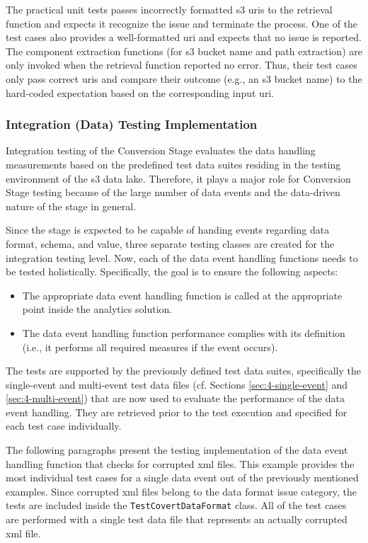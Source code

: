 The practical unit tests passes incorrectly formatted \ac{s3} \acp{uri} to the retrieval function and expects it recognize the issue and terminate the process. One of the test cases also provides a well-formatted \ac{uri} and expects that no issue is reported. The component extraction functions (for \ac{s3} bucket name and path extraction) are only invoked when the retrieval function reported no error. Thus, their test cases only pass correct \acp{uri} and compare their outcome (e.g., an \ac{s3} bucket name) to the hard-coded expectation based on the corresponding input \ac{uri}.

\subsubsection{Integration (Data) Testing Implementation}
Integration testing of the Conversion Stage evaluates the data handling measurements based on the predefined test data suites residing in the testing environment of the \ac{s3} data lake. Therefore, it plays a major role for Conversion Stage testing because of the large number of data events and the data-driven nature of the stage in general.

Since the stage is expected to be capable of handing events regarding data format, schema, and value, three separate testing classes are created for the integration testing level. Now, each of the data event handling functions needs to be tested holistically. Specifically, the goal is to ensure the following aspects:

\begin{itemize}
	\item The appropriate data event handling function is called at the appropriate point inside the analytics solution.
	\item The data event handling function performance complies with its definition (i.e., it performs all required measures if the event occurs).
\end{itemize}

The tests are supported by the previously defined test data suites, specifically the single-event and multi-event test data files (cf. Sections \ref{sec:4-single-event} and \ref{sec:4-multi-event}) that are now used to evaluate the performance of the data event handling. They are retrieved prior to the test execution and specified for each test case individually.

The following paragraphs present the testing implementation of the data event handling function that checks for corrupted \ac{xml} files. This example provides the most individual test cases for a single data event out of the previously mentioned examples. Since corrupted \ac{xml} files belong to the data format issue category, the tests are included inside the \texttt{TestCovertDataFormat} class. All of the test cases are performed with a single test data file that represents an actually corrupted \ac{xml} file.

